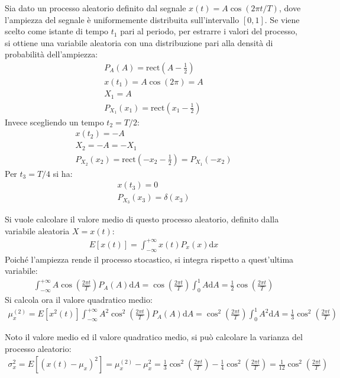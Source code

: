 \documentclass{article}
\newcommand{\rect}{\mathrm{rect}}
\newcommand{\df}{\mathrm{d}}
\numberwithin{equation}{subsection}
\begin{document}
Sia dato un processo aleatorio definito dal segnale $x(t)=A\cos(2\pi t/T)$, dove l'ampiezza del segnale è uniformemente distribuita sull'intervallo $[0,1]$. 
Se viene scelto come istante di tempo $t_1$ pari al periodo, per estrarre i valori del processo, si ottiene una variabile aleatoria con una distribuzione pari alla densità di probabilità 
dell'ampiezza:
\begin{gather*}
    P_A(A)=\rect\displaystyle\left(A-\frac{1}{2}\right)\\
    x(t_1)=A\cos(2\pi)=A\\
    X_1=A\\
    P_{X_1}(x_1)=\displaystyle\rect\left(x_1-\frac{1}{2}\right)
\end{gather*}
Invece scegliendo un tempo $t_2=T/2$:
\begin{gather*}
    x(t_2)=-A\\
    X_2=-A=-X_1\\
    P_{X_2}(x_2)=\displaystyle\rect\left(-x_2-\frac{1}{2}\right)=P_{X_1}(-x_2)
\end{gather*}
Per $t_3=T/4$ si ha:
\begin{gather*}
    x(t_3)=0\\
    P_{X_3}(x_3)=\delta(x_3)
\end{gather*}

Si vuole calcolare il valore medio di questo processo aleatorio, definito dalla variabile aleatoria $X=x(t)$:
\begin{gather*}
    E[x(t)]=\displaystyle\int_{-\infty}^{+\infty}x(t)P_x(x)\df x
\end{gather*}
Poiché l'ampiezza rende il processo stocastico, si integra rispetto a quest'ultima variabile:
\begin{gather*}
    \displaystyle\int_{-\infty}^{+\infty}A\cos\left(\frac{2\pi t}{T}\right)P_A(A)\df A=\cos\left(\frac{2\pi t}{T}\right)\int_0^1A\df A=\frac{1}{2}\cos\left(\frac{2\pi t}{T}\right)
\end{gather*}
Si calcola ora il valore quadratico medio:
\begin{gather*}
    \mu_x^{(2)}=E[x^2(t)]\displaystyle\int_{-\infty}^{+\infty}A^2\cos^2\left(\frac{2\pi t}{T}\right)P_A(A)\df A=\cos^2\left(\frac{2\pi t}{T}\right)\int_0^1A^2\df A=\frac{1}{3}\cos^2\left(\frac{2\pi t}{T}\right)
\end{gather*}


Noto il valore medio ed il valore quadratico medio, si può calcolare la varianza del processo aleatorio:
\begin{gather*}
    \sigma_x^2=E[(x(t)-\mu_x)^2]=\mu_x^{(2)}-\mu_x^2=\displaystyle\frac{1}{3}\cos^2\left(\frac{2\pi t}{T}\right)-\frac{1}{4}\cos^2\left(\frac{2\pi t}{T}\right)=\frac{1}{12}\cos^2\left(\frac{2\pi t}{T}\right)
\end{gather*}
\end{document}
